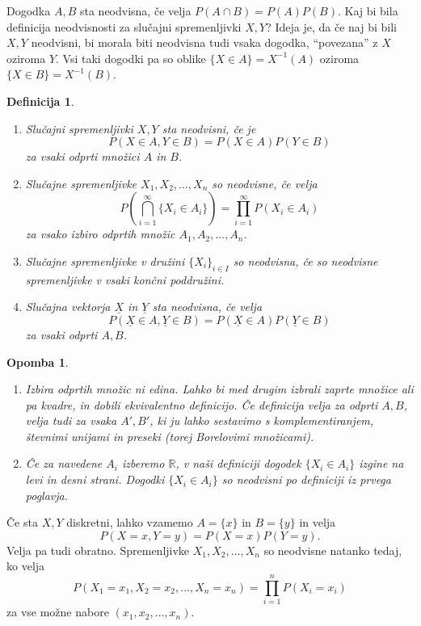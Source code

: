 \documentclass[10pt, a4paper]{article}
\newtheorem{defi}[izr]{Definicija}
\newenvironment{noticeB}{%
  \tcolorbox[%
  notitle,
  empty,
  enhanced,  %
  breakable,
  coltext=black,
  colback=white, 
  fontupper=\rmfamily,
  parbox=false,
  noparskip,
  sharp corners,
  boxrule=-1pt,  %
  frame hidden,
  left=7pt,  %
  right=7pt,
  top=5pt,
  bottom=5pt,
  before skip=2.5ex plus 2pt,
  after skip=2.5ex plus 2pt,
  borderline west = {1.5pt}{-0.1pt}{blue!30!black}, %
  overlay unbroken and last={%
    \draw[color=black, line width=1.25pt]
    ($(frame.south west)+(1.pt, -0.1pt)$) -- ++(2em, 0);
  }
  ]}
{\endtcolorbox}
\newenvironment{definicija}{\begin{defi}\begin{noticeB}}{%
    \end{noticeB}\end{defi}}
\newtheorem*{opomba}{Opomba}
\newcommand{\R}{\mathbb {R}}
\begin{document}
Dogodka $A, B$ sta neodvisna, če velja $P(A \cap B) = P(A) P(B)$.
Kaj bi bila definicija neodvisnosti za slučajni spremenljivki $X, Y$?
Ideja je, da če naj bi bili $X, Y$ neodvisni, bi morala biti neodvisna 
tudi vsaka dogodka, "`povezana"' z $X$ oziroma $Y$.
Vsi taki dogodki pa so oblike $\{X \in A\} = X^{-1} (A)$ oziroma
$\{X \in B\} = X^{-1} (B)$.

\begin{definicija}
  \begin{enumerate}
    \item Slučajni spremenljivki $X, Y$ sta neodvisni,
    če je $$P(X \in A, Y \in B) = P(X \in A) P(Y \in B)$$
    za vsaki odprti množici $A$ in $B$.
    \item Slučajne spremenljivke $X_1, X_2, \dots, X_n$ so neodvisne, 
    če velja $$P\left( \bigcap_{i = 1}^\infty \{X_i \in A_i\}\right) = \prod_{i = 1}^\infty P(X_i \in A_i)$$
    za vsako izbiro odprtih množic $A_1, A_2, \dots, A_n$.
    \item Slučajne spremenljivke v družini $\{X_i\}_{i \in I}$ so neodvisna, če so neodvisne spremenljivke v vsaki končni poddružini.
    \item Slučajna vektorja $\underline{X}$ in $\underline{Y}$ sta neodvisna, če velja 
    $$P(\underline{X} \in A, \underline{Y} \in B) = P(\underline{X} \in A) P(\underline{Y} \in B)$$ za vsaki odprti $A, B$.
  \end{enumerate}
\end{definicija}

\begin{opomba}
  \begin{enumerate}
    \item Izbira odprtih množic ni edina. Lahko bi med drugim izbrali zaprte množice ali pa kvadre, 
    in dobili ekvivalentno definicijo. Če definicija velja za odprti $A, B$,
    velja tudi za vsaka $A', B'$, ki ju lahko sestavimo s komplementiranjem, števnimi unijami in preseki (torej Borelovimi množicami).
    \item Če za navedene $A_i$ izberemo $\R$, v naši definiciji dogodek $\{X_i \in A_i\}$ izgine na levi in desni strani.
    Dogodki $\{X_i \in A_i\}$ so neodvisni po definiciji iz prvega poglavja.
  \end{enumerate}
\end{opomba}    

Če sta $X, Y$ diskretni, lahko vzamemo $A = \{x\}$ in $B = \{y\}$ in
velja $$P(X = x, Y = y) = P(X = x) P(Y = y).$$
Velja pa tudi obratno. Spremenljivke $X_1, X_2, \dots, X_n$ so neodvisne natanko tedaj,
ko velja $$P(X_1 = x_1, X_2 = x_2, \dots, X_n = x_n) = \prod_{i = 1} ^n P(X_i = x_i)$$
za vse možne nabore $(x_1, x_2, \dots, x_n)$.
\end{document}
